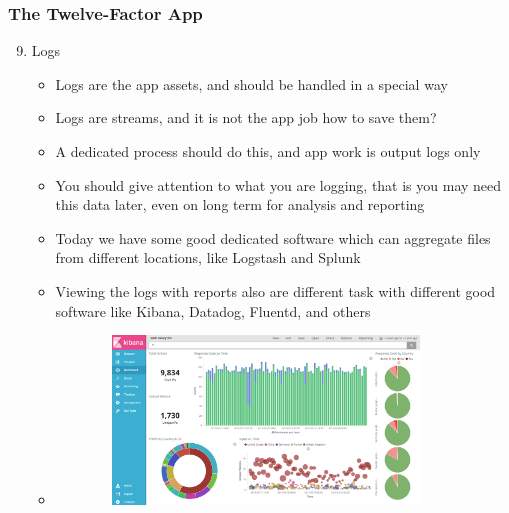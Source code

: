\documentclass{beamer}
\begin{document}
	\begin{frame}
		\frametitle{The Twelve-Factor App}
			\begin{enumerate}
				\setcounter{enumi}{8}
				\item Logs \\
				\begin{itemize}
					\item<1->[] \scriptsize{Logs are the app assets, and should be handled in a special way}
					\item<2-> \scriptsize {Logs are streams, and it is not the app job how to save them?}
					\item<3-> \scriptsize {A dedicated process should do this, and app work is output logs only}
					\item<4-> \scriptsize {You should give attention to what you are logging, that is you may need this data later, even on long term for analysis and reporting}
					\item<5-> \scriptsize {Today we have some good dedicated software which can aggregate files from different locations, like Logstash and Splunk}
					\item<6-> \scriptsize {Viewing the logs with reports also are different task with different good software like Kibana, Datadog, Fluentd, and others }
					\item<2->[]
					\begin{figure}[h]
						\includegraphics[width=90mm,height= 45mm, scale=1]{img/logs.png}
					\end{figure}
				\end{itemize}
			\end{enumerate}
			\vspace{100mm}
	\end{frame}
	
\end{document}
